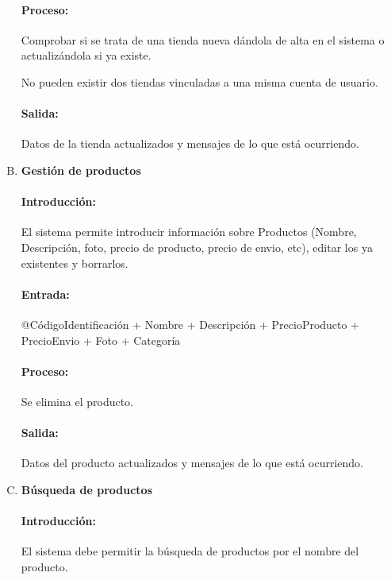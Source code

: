 \begin{enumerate}[A.]
        \paragraph{Proceso:} Comprobar si se trata de una tienda nueva dándola de alta en el sistema o actualizándola si ya existe.

No pueden existir dos tiendas vinculadas a una misma cuenta de usuario.
        
        \paragraph{Salida:} Datos de la tienda actualizados y mensajes de lo que está ocurriendo.
        
         \item \textbf{Gestión de productos}
        
        \paragraph{Introducción:}El sistema permite introducir información sobre Productos (Nombre, Descripción, foto, precio de producto, precio de envio, etc), editar los ya existentes y borrarlos.
        
        \paragraph{Entrada:} @CódigoIdentificación + Nombre + Descripción + PrecioProducto + PrecioEnvio + Foto + Categoría 
        
        \paragraph{Proceso:} Se elimina el producto.
        
        \paragraph{Salida:} Datos del producto actualizados y mensajes de lo que está ocurriendo.
        
          \item \textbf{Búsqueda de productos}
        
        \paragraph{Introducción:}El sistema debe permitir la búsqueda de productos por el nombre del producto. 
        

\end{enumerate}
